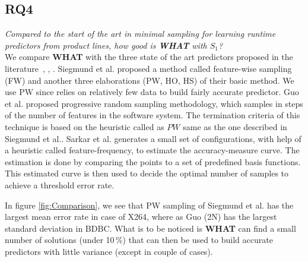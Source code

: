 \documentclass{sig-alternative}
\newcommand{\bi}{\begin{itemize}}%
\newcommand{\ei}{\end{itemize}}
\newcommand{\what}{{\bf WHAT }}
\begin{document}
 
\subsection{RQ4}
 
{\em Compared to the start of the art in minimal sampling for
learning runtime predictors from product lines, how good is \what with $S_1$?}\\

We compare \what with the three state of the art predictors proposed in the literature~\cite{siegmund2012predicting}, \cite{guo2013variability}, \cite{sarkar2015cost}. Siegmund et al. proposed a method called feature-wise sampling (FW) and 
 another three elaborations (PW, HO, HS) of their basic method. We use PW since relies on relatively few data to build fairly accurate predictor. Guo et al. proposed progressive random sampling methodology, which samples in steps of the number of features in the software system. The termination criteria of this technique is based on the heuristic called as $PW$ same as the one described in  Siegmund et al.. Sarkar et al. generates a small set of configurations, with help of a heuristic called feature-frequency,  to estimate the accuracy-measure curve. The estimation is done by comparing the points to a set of predefined basis functions. This estimated curve is then used to decide the optimal number of samples to achieve a threshold error rate.  
 
 In figure \ref{fig:Comparison}, we see that PW sampling of Siegmund et al. has the largest mean error rate in case of X264, where as Guo (2N) has the largest standard deviation in BDBC.  What is to be noticed is \what can find a small number of solutions (under 10\,\%) that can then be used to build accurate predictors with little variance (except in couple of cases).
    
\end{document}
